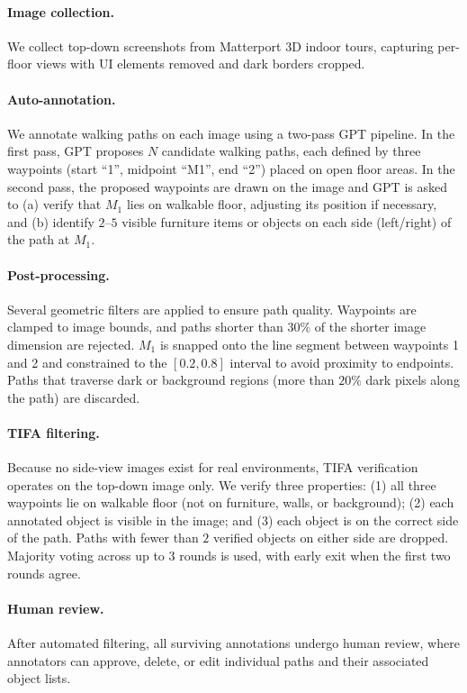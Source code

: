 \paragraph{Image collection.}
We collect top-down screenshots from Matterport 3D indoor tours, capturing per-floor views with UI elements removed and dark borders cropped.

\paragraph{Auto-annotation.}
We annotate walking paths on each image using a two-pass GPT pipeline.
In the first pass, GPT proposes $N$ candidate walking paths, each defined by three waypoints (start ``1'', midpoint ``M1'', end ``2'') placed on open floor areas.
In the second pass, the proposed waypoints are drawn on the image and GPT is asked to (a) verify that $M_1$ lies on walkable floor, adjusting its position if necessary, and (b) identify $2$--$5$ visible furniture items or objects on each side (left/right) of the path at $M_1$.

\paragraph{Post-processing.}
Several geometric filters are applied to ensure path quality.
Waypoints are clamped to image bounds, and paths shorter than $30\%$ of the shorter image dimension are rejected.
$M_1$ is snapped onto the line segment between waypoints 1 and 2 and constrained to the $[0.2, 0.8]$ interval to avoid proximity to endpoints.
Paths that traverse dark or background regions (more than $20\%$ dark pixels along the path) are discarded.

\paragraph{TIFA filtering.}
Because no side-view images exist for real environments, TIFA verification operates on the top-down image only.
We verify three properties: (1) all three waypoints lie on walkable floor (not on furniture, walls, or background); (2) each annotated object is visible in the image; and (3) each object is on the correct side of the path.
Paths with fewer than $2$ verified objects on either side are dropped.
Majority voting across up to $3$ rounds is used, with early exit when the first two rounds agree.

\paragraph{Human review.}
After automated filtering, all surviving annotations undergo human review, where annotators can approve, delete, or edit individual paths and their associated object lists.

